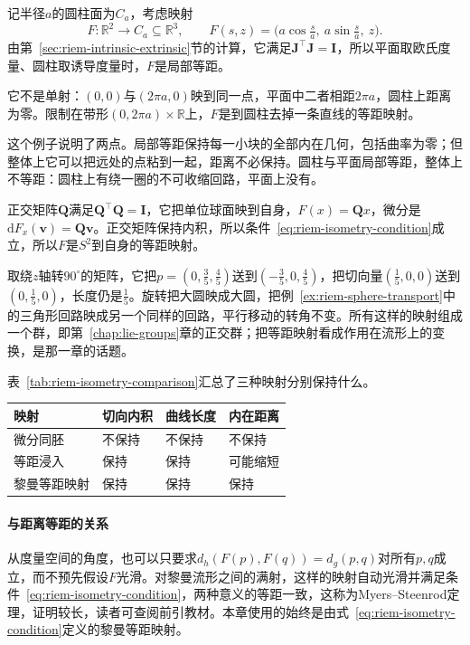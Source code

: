 \begin{example}[把平面卷成圆柱]
\label{ex:riem-plane-cylinder}
记半径$a$的圆柱面为$C_a$，考虑映射
\[
F:\mathbb R^2\to C_a\subseteq\mathbb R^3,\qquad F(s,z)=\bigl(a\cos\tfrac sa,\ a\sin\tfrac sa,\ z\bigr).
\]
由第~\ref{sec:riem-intrinsic-extrinsic}节的计算，它满足$\bm J^{\top}\bm J=\bm I$，所以平面取欧氏度量、圆柱取诱导度量时，$F$是局部等距。

它不是单射：$(0,0)$与$(2\pi a,0)$映到同一点，平面中二者相距$2\pi a$，圆柱上距离为零。限制在带形$(0,2\pi a)\times\mathbb R$上，$F$是到圆柱去掉一条直线的等距映射。

这个例子说明了两点。局部等距保持每一小块的全部内在几何，包括曲率为零；但整体上它可以把远处的点粘到一起，距离不必保持。圆柱与平面局部等距，整体上不等距：圆柱上有绕一圈的不可收缩回路，平面上没有。
\end{example}

\begin{example}[球面的旋转]
\label{ex:riem-sphere-rotations}
正交矩阵$\bm Q$满足$\bm Q^{\top}\bm Q=\bm I$，它把单位球面映到自身，$F(x)=\bm Qx$，微分是$\mathrm dF_x(\bm v)=\bm Q\bm v$。正交矩阵保持内积，所以条件~\eqref{eq:riem-isometry-condition}成立，所以$F$是$S^2$到自身的等距映射。

取绕$z$轴转$90^\circ$的矩阵，它把$p=(0,\tfrac35,\tfrac45)$送到$(-\tfrac35,0,\tfrac45)$，把切向量$(\tfrac15,0,0)$送到$(0,\tfrac15,0)$，长度仍是$\tfrac15$。旋转把大圆映成大圆，把例~\ref{ex:riem-sphere-transport}中的三角形回路映成另一个同样的回路，平行移动的转角不变。所有这样的映射组成一个群，即第~\ref{chap:lie-groups}章的正交群；把等距映射看成作用在流形上的变换，是那一章的话题。
\end{example}

表~\ref{tab:riem-isometry-comparison}汇总了三种映射分别保持什么。

\begin{BookInlineTable}
  \centering
  \begin{tabular}{llll}
    \toprule
    映射 & 切向内积 & 曲线长度 & 内在距离\\
    \midrule
    微分同胚 & 不保持 & 不保持 & 不保持\\
    等距浸入 & 保持 & 保持 & 可能缩短\\
    黎曼等距映射 & 保持 & 保持 & 保持\\
    \bottomrule
  \end{tabular}
  \caption{三类映射保持的几何量。}
  \label{tab:riem-isometry-comparison}
\end{BookInlineTable}

\paragraph{与距离等距的关系}
从度量空间的角度，也可以只要求$d_h(F(p),F(q))=d_g(p,q)$对所有$p,q$成立，而不预先假设$F$光滑。对黎曼流形之间的满射，这样的映射自动光滑并满足条件~\eqref{eq:riem-isometry-condition}，两种意义的等距一致，这称为Myers--Steenrod定理，证明较长，读者可查阅前引教材。本章使用的始终是由式~\eqref{eq:riem-isometry-condition}定义的黎曼等距映射。
